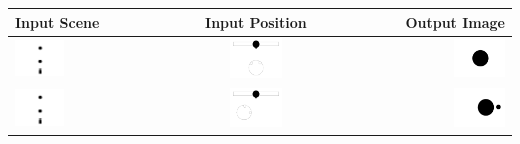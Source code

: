\documentclass[11pt]{article}
\begin{document}
\begin{tabular}[pos]{| l | c | r |}
\hline
Input Scene & Input Position & Output Image
\\ \hline
\includegraphics[width=0.33\textwidth]{./img/input_scene1.png}
&
\includegraphics[width=0.33\textwidth]{./img/input_position1.png}
&
\includegraphics[width=0.33\textwidth]{./img/output1.png}
\\ \hline
\includegraphics[width=0.33\textwidth]{./img/input_scene2.png}
&
\includegraphics[width=0.33\textwidth]{./img/input_position2.png}
&
\includegraphics[width=0.33\textwidth]{./img/output2.png}

\end{tabular}
\end{document}
